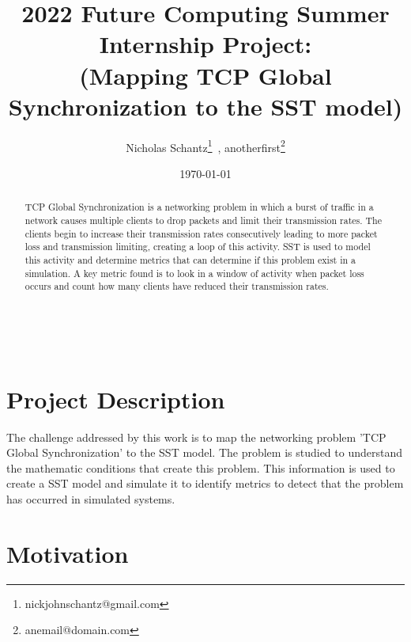 \documentclass{article}
\begin{document}
    \begin{minipage}[h]{\textwidth}
        \title{2022 Future Computing Summer Internship Project:\\(Mapping TCP Global Synchronization to the SST model)}
        \author{Nicholas Schantz\footnote{nickjohnschantz@gmail.com}\ , 
        anotherfirst\footnote{anemail@domain.com}}
        \date{\today}
            \maketitle
        \begin{abstract}
            TCP Global Synchronization is a networking problem in which a burst of traffic in a network causes multiple clients to drop packets and limit their transmission rates. The clients begin to increase their transmission rates consecutively leading to more packet loss and transmission limiting, creating a loop of this activity. SST is used to model this activity and determine metrics that can determine if this problem exist in a simulation. A key metric found is to look in a window of activity when packet loss occurs and count how many clients have reduced their transmission rates.
        \end{abstract}
    \end{minipage}

\ \\


\section{Project Description} %

The challenge addressed by this work is to map the networking problem 'TCP Global Synchronization' to the SST model. The problem is studied to understand the mathematic conditions that create this problem. This information is used to create a SST model and simulate it to identify metrics to detect that the problem has occurred in simulated systems.

\section{Motivation} %
\end{document}

